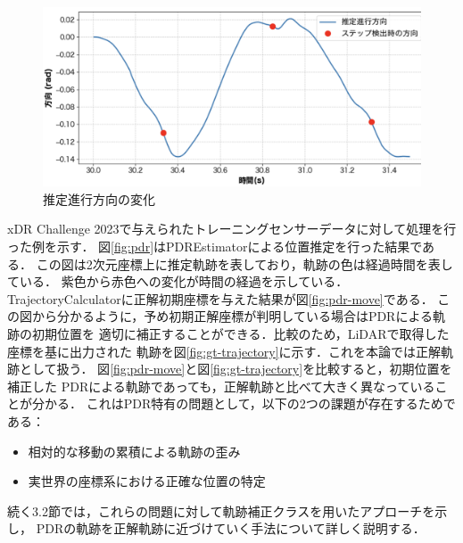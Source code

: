 \begin{figure}[H]
	\centering
	\includegraphics[width=\linewidth]{image/step_timing_angle.jpg}
	\caption{推定進行方向の変化}    \label{fig:step_timing}
\end{figure}


xDR Challenge 2023で与えられたトレーニングセンサーデータに対して処理を行った例を示す．
図\ref{fig:pdr}はPDREstimatorによる位置推定を行った結果である．
この図は2次元座標上に推定軌跡を表しており，軌跡の色は経過時間を表している．
紫色から赤色への変化が時間の経過を示している．
TrajectoryCalculatorに正解初期座標を与えた結果が図\ref{fig:pdr-move}である．
この図から分かるように，予め初期正解座標が判明している場合はPDRによる軌跡の初期位置を
適切に補正することができる．比較のため，LiDARで取得した座標を基に出力された
軌跡を図\ref{fig:gt-trajectory}に示す．これを本論では正解軌跡として扱う．
図\ref{fig:pdr-move}と図\ref*{fig:gt-trajectory}を比較すると，初期位置を補正した
PDRによる軌跡であっても，正解軌跡と比べて大きく異なっていることが分かる．
これはPDR特有の問題として，以下の2つの課題が存在するためである：

\begin{itemize}
    \item 相対的な移動の累積による軌跡の歪み
    \item 実世界の座標系における正確な位置の特定
\end{itemize}


続く3.2節では，これらの問題に対して軌跡補正クラスを用いたアプローチを示し，
PDRの軌跡を正解軌跡に近づけていく手法について詳しく説明する．


